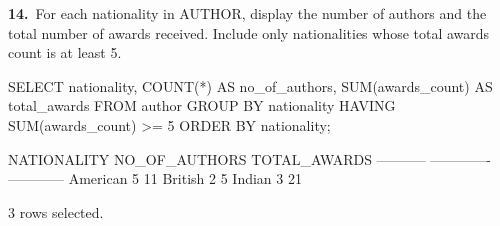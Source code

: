 \noindent\begin{minipage}{\linewidth}
\begingroup{}
{\fontsize{14}{17}\selectfont\textbf{14.}}\ For each nationality in AUTHOR, display the number of authors and the total number of awards received. Include only nationalities whose total awards count is at least 5.\par
\endgroup\vspace{12pt}


\begin{sqlcode}
SELECT nationality, COUNT(*) AS no_of_authors,
       SUM(awards_count) AS total_awards
FROM author
GROUP BY nationality
HAVING SUM(awards_count) >= 5
ORDER BY nationality;
\end{sqlcode}

\vspace{18pt}


\begin{sqlout}[fontsize=\small]
NATIONALITY  NO_OF_AUTHORS  TOTAL_AWARDS
-----------  -------------  ------------
American                 5            11
British                  2             5
Indian                   3            21

3 rows selected.
\end{sqlout}
\end{minipage}\par\vspace{24pt}

